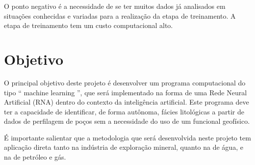 O ponto negativo é a necessidade de se ter muitos dados já analisados em situações conhecidas e variadas para a realização da etapa de treinamento. A etapa de treinamento tem um custo computacional alto.

\section{Objetivo}
O principal objetivo deste projeto é desenvolver um programa computacional do tipo “ machine learning ”, que será implementado na forma de uma Rede Neural Artificial (RNA) dentro do contexto da inteligência artificial. Este programa deve ter a capacidade de identificar, de forma autônoma, fácies litológicas a partir de dados de perfilagem de poços sem a necessidade do uso de um funcional geofísico.

É importante salientar que a metodologia que será desenvolvida neste projeto tem aplicação direta tanto na indústria de exploração mineral, quanto na de água, e na de petróleo e gás.
